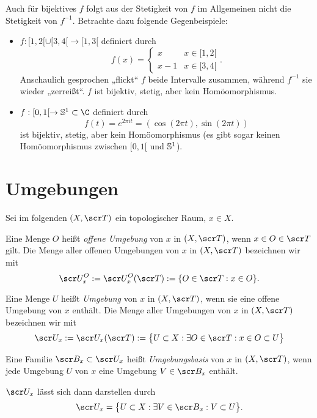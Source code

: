\begin{nt}
	Auch für bijektives $f$ folgt aus der Stetigkeit von $f$ im Allgemeinen nicht die Stetigkeit von $f^{-1}$.
	Betrachte dazu folgende Gegenbeispiele:
	\begin{itemize}
		\item
			$f: [1,2[ \cup [3,4[ \to [1,3[$ definiert durch
			\[
				f(x) = \begin{cases}
					x & x \in [1,2[ \\
					x - 1 & x \in [3,4[
				\end{cases}.
			\]
			Anschaulich gesprochen „flickt“ $f$ beide Intervalle zusammen, während $f^{-1}$ sie wieder „zerreißt“.
			$f$ ist bijektiv, stetig, aber kein Homöomorphismus.
		\item
			$f : [0,1[ \to \S^1 \subset \C$ definiert durch
			\[
				f(t)
				= e^{2\pi i t}
				= (\cos (2\pi t), \sin (2\pi t))
			\]
			ist bijektiv, stetig, aber kein Homöomorphismus (es gibt sogar keinen Homöomorphismus zwischen $[0,1[$ und $\S^1$).
	\end{itemize}
\end{nt}


\section{Umgebungen}


Sei im folgenden $(X, \scr T)$ ein topologischer Raum, $x \in X$.

\begin{df}
	Eine Menge $O$ heißt \emph{offene Umgebung} von $x$ in $(X,\scr T)$, wenn $x \in O \in \scr T$ gilt.
	Die Menge aller offenen Umgebungen von $x$ in $(X, \scr T)$ bezeichnen wir mit
	\[
		\scr U_x^O := \scr U_x^O(\scr T)
		:= \{ O \in \scr T : x \in O \}.
	\]

	Eine Menge $U$ heißt \emph{Umgebung} von $x$ in $(X, \scr T)$, wenn sie eine offene Umgebung von $x$ enthält.
	Die Menge aller Umgebungen von $x$ in $(X, \scr T)$ bezeichnen wir mit
	\[
		\scr U_x := \scr U_x(\scr T)
		:= \big\{ U \subset X : \exists O \in \scr T : x \in O \subset U \big\}
	\]
\end{df}

\begin{df}
	Eine Familie $\scr B_x \subset \scr U_x$ heißt \emph{Umgebungsbasis} von $x$ in $(X, \scr T)$, wenn jede Umgebung $U$ von $x$ eine Umgebung $V \in \scr B_x$ enthält.

	$\scr U_x$ lässt sich dann darstellen durch
	\[
		\scr U_x = \big\{ U \subset X : \exists V \in \scr B_x : V \subset U \big\}.
	\]
\end{df}

